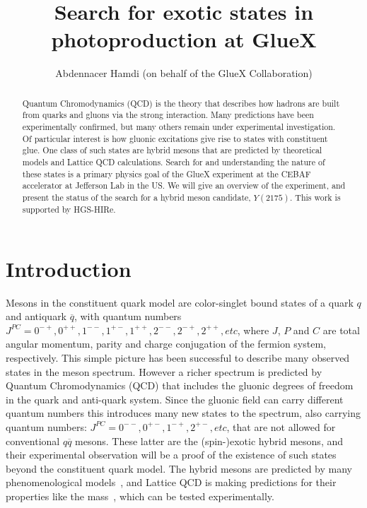 \documentclass[a4paper]{jpconf}
\begin{document}
\title{Search for exotic states in photoproduction at GlueX}

\author{Abdennacer Hamdi (on behalf of the GlueX Collaboration)}

\address{GSI Helmholtzzentrum f\"ur Schwerionenforschung GmbH, Planckstr. 1, 64291 Darmstadt, Germany}


\begin{abstract}
    Quantum Chromodynamics (QCD) is the theory that describes how hadrons are built from quarks and gluons via the strong interaction. Many predictions have been experimentally confirmed, but many others remain under experimental investigation. Of particular interest is how gluonic excitations give rise to states with constituent glue. One class of such states are hybrid mesons that are predicted by theoretical models and Lattice QCD calculations. Search for and understanding the nature of these states is a primary physics goal of the GlueX experiment at the CEBAF accelerator at Jefferson Lab in the US. We will give an overview of the experiment, and present the status of the search for a hybrid meson candidate, $Y(2175)$. This work is supported by HGS-HIRe.
\end{abstract}

\section{Introduction}
Mesons in the constituent quark model are color-singlet bound states of a quark $q$ and antiquark $\overline{q}$, with quantum numbers $J^{PC} = 0^{-+}, 0^{++}, 1^{--}, 1^{+-}, 1^{++}, 2^{--}, 2^{-+}, 2^{++}, etc$, where $J$, $P$ and $C$ are total angular momentum, parity and charge conjugation of the fermion system, respectively. This simple picture has been successful to describe many observed states in the meson spectrum. However a richer spectrum is predicted by Quantum Chromodynamics (QCD) that includes the gluonic degrees of freedom in the quark and anti-quark system. Since the gluonic field can carry different quantum numbers this introduces many new states to the spectrum, also carrying quantum numbers: $J^{PC} = 0^{--}, 0^{+-}, 1^{-+}, 2^{+-}, etc$, that are not allowed for conventional $q\overline{q}$ mesons. These latter are the (spin-)exotic hybrid mesons, and their experimental observation will be a proof of the existence of such states beyond the constituent quark model. The hybrid mesons are predicted by many phenomenological models~\cite{ref.1}, and Lattice QCD is making predictions for their properties like the mass~\cite{ref.2}, which can be tested experimentally.
\end{document}
